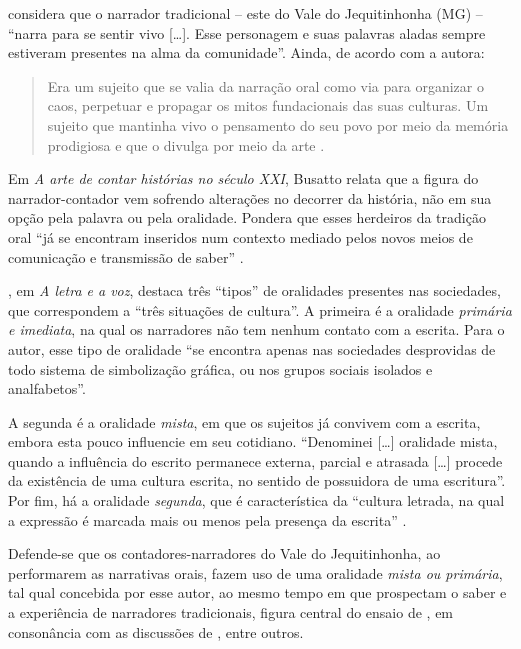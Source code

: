 \documentclass[portuguese]{textolivre}
\begin{document}
\textcite[p. 17-18]{Busatto2013} considera que o narrador tradicional – este do Vale do Jequitinhonha (MG) – “narra para se sentir vivo […]. Esse personagem e suas palavras aladas sempre estiveram presentes na alma da comunidade”. Ainda, de acordo com a autora:

\begin{quote}
    Era um sujeito que se valia da narração oral como via para organizar o caos, perpetuar e propagar os mitos fundacionais das suas culturas. Um sujeito que mantinha vivo o pensamento do seu povo por meio da memória prodigiosa e que o divulga por meio da arte \cite[p. 18]{Busatto2013}.
\end{quote}

Em \textit{A arte de contar histórias no século XXI}, Busatto relata que a figura do narrador-contador vem sofrendo alterações no decorrer da história, não em sua opção pela palavra ou pela oralidade. Pondera que esses herdeiros da tradição oral “já se encontram inseridos num contexto mediado pelos novos meios de comunicação e transmissão de saber” \cite[p. 19]{Busatto2013}.

\textcite[p. 18]{Zumthor1993}, em \textit{A letra e a voz}, destaca três “tipos” de oralidades presentes nas sociedades, que correspondem a “três situações de cultura”. A primeira é a oralidade \textit{primária e imediata}, na qual os narradores não tem nenhum contato com a escrita. Para o autor, esse tipo de oralidade “se encontra apenas nas sociedades desprovidas de todo sistema de simbolização gráfica, ou nos grupos sociais isolados e analfabetos”.
    
A segunda é a oralidade \textit{mista}, em que os sujeitos já convivem com a escrita, embora esta pouco influencie em seu cotidiano. “Denominei […] oralidade mista, quando a influência do escrito permanece externa, parcial e atrasada […] procede da existência de uma cultura escrita, no sentido de possuidora de uma escritura”. Por fim, há a oralidade \textit{segunda}, que é característica da “cultura letrada, na qual a expressão é marcada mais ou menos pela presença da escrita” \cite[p. 18]{Zumthor1993}.
     
Defende-se que os contadores-narradores do Vale do Jequitinhonha, ao performarem as narrativas orais, fazem uso de uma oralidade \textit{mista ou primária}, tal qual concebida por esse autor, ao mesmo tempo em que prospectam o saber e a experiência de narradores tradicionais, figura central do ensaio de \textcite{Benjamin1985}, em consonância com as discussões de \textcite{Busatto2013,Pereira1996}, entre outros.
    
\end{document}
